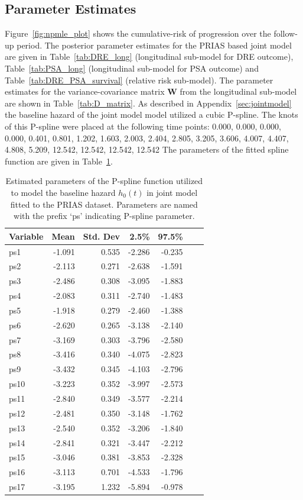 \clearpage
\subsection{Parameter Estimates}
Figure~\ref{fig:npmle_plot} shows the cumulative-risk of progression over the follow-up period. The posterior parameter estimates for the PRIAS based joint model are given in Table~\ref{tab:DRE_long} (longitudinal sub-model for DRE outcome), Table~\ref{tab:PSA_long} (longitudinal sub-model for PSA outcome) and Table~\ref{tab:DRE_PSA_survival} (relative risk sub-model). The parameter estimates for the variance-covariance matrix $\boldsymbol{W}$ from the longitudinal sub-model are shown in Table~\ref{tab:D_matrix}.  As described in Appendix~\ref{sec:jointmodel} the baseline hazard of the joint model model utilized a cubic P-spline. The knots of this P-spline were placed at the following time points:
0.000, 0.000, 0.000, 0.000, 0.401, 0.801, 1.202, 1.603, 2.003, 2.404, 2.805, 3.205, 3.606, 4.007, 4.407, 4.808, 5.209, 12.542, 12.542, 12.542, 12.542
The parameters of the fitted spline function are given in Table~\ref{tab:baseline_hazard}.
\begin{table}[!htb]
\begin{center}
\caption{Estimated parameters of the P-spline function utilized to model the baseline hazard $h_0(t)$ in joint model fitted to the PRIAS dataset. Parameters are named with the prefix `ps' indicating P-spline parameter.}
\label{tab:baseline_hazard}
\begin{tabular}{lrrrrrr}
\hline
\hline
Variable                         & Mean & Std. Dev & 2.5\%  & 97.5\%   \\
\hline
ps1  & -1.091 & 0.535 & -2.286 & -0.235 \\
ps2  & -2.113 & 0.271 & -2.638 & -1.591 \\
ps3  & -2.486 & 0.308 & -3.095 & -1.883 \\
ps4  & -2.083 & 0.311 & -2.740 & -1.483 \\
ps5  & -1.918 & 0.279 & -2.460 & -1.388 \\
ps6  & -2.620 & 0.265 & -3.138 & -2.140 \\
ps7  & -3.169 & 0.303 & -3.796 & -2.580 \\
ps8  & -3.416 & 0.340 & -4.075 & -2.823 \\
ps9  & -3.432 & 0.345 & -4.103 & -2.796 \\
ps10 & -3.223 & 0.352 & -3.997 & -2.573 \\
ps11 & -2.840 & 0.349 & -3.577 & -2.214 \\
ps12 & -2.481 & 0.350 & -3.148 & -1.762 \\
ps13 & -2.540 & 0.352 & -3.206 & -1.840 \\
ps14 & -2.841 & 0.321 & -3.447 & -2.212 \\
ps15 & -3.046 & 0.381 & -3.853 & -2.328 \\
ps16 & -3.113 & 0.701 & -4.533 & -1.796 \\
ps17 & -3.195 & 1.232 & -5.894 & -0.978 \\
\hline
\end{tabular}
\end{center}
\end{table}


